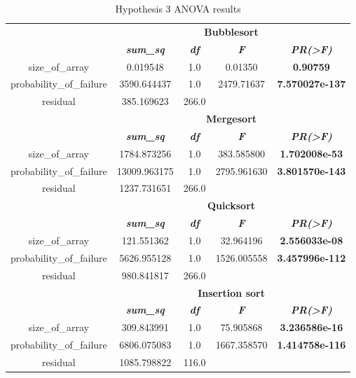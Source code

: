 \begin{table}[H]
    \caption{Hypothesis 3 ANOVA results}
    \begin{center}
    \begin{tabular}{|c|c|c|c|c|}
    \hline
    \multirow{2}{*}{\hfill}&\multicolumn{4}{|c|}{\textbf{Bubblesort}} \\
    \cline{2-5}
    &\textbf{\textit{sum\_sq}} & \textbf{\textit{df}} & \textbf{\textit{F}} & \textbf{\textit{PR(>F)}} \\
    \hline
    size\_of\_array & 0.019548 & 1.0 & 0.01350 & \textbf{0.90759} \\
    \hline
    probability\_of\_failure & 3590.644437 & 1.0 & 2479.71637 & \textbf{7.570027e-137} \\
    \hline
    residual & 385.169623 & 266.0 & &  \\
    \hline
    \multirow{2}{*}{\hfill}&\multicolumn{4}{|c|}{\textbf{Mergesort}} \\
    \cline{2-5}
    &\textbf{\textit{sum\_sq}} & \textbf{\textit{df}} & \textbf{\textit{F}} & \textbf{\textit{PR(>F)}} \\
    \hline
    size\_of\_array & 1784.873256 & 1.0 & 383.585800 & \textbf{1.702008e-53} \\
    \hline
    probability\_of\_failure & 13009.963175 & 1.0 & 2795.961630 & \textbf{3.801570e-143} \\
    \hline
    residual & 1237.731651 & 266.0 & &  \\
    \hline
    \multirow{2}{*}{\hfill}&\multicolumn{4}{|c|}{\textbf{Quicksort}} \\
    \cline{2-5}
    &\textbf{\textit{sum\_sq}} & \textbf{\textit{df}} & \textbf{\textit{F}} & \textbf{\textit{PR(>F)}} \\
    \hline
    size\_of\_array & 121.551362 & 1.0 & 32.964196 & \textbf{2.556033e-08} \\
    \hline
    probability\_of\_failure & 5626.955128 & 1.0 & 1526.005558 & \textbf{3.457996e-112} \\
    \hline
    residual & 980.841817 & 266.0 & &  \\
    \hline
    \multirow{2}{*}{\hfill}&\multicolumn{4}{|c|}{\textbf{Insertion sort}} \\
    \cline{2-5}
    &\textbf{\textit{sum\_sq}} & \textbf{\textit{df}} & \textbf{\textit{F}} & \textbf{\textit{PR(>F)}} \\
    \hline
    size\_of\_array & 309.843991 & 1.0 & 75.905868 & \textbf{3.236586e-16} \\
    \hline
    probability\_of\_failure & 6806.075083 & 1.0 & 1667.358570 & \textbf{1.414758e-116} \\
    \hline
    residual & 1085.798822 & 116.0 & & \\
    \hline
    \end{tabular}
    \label{tab-hypothesis3-testing}
    \end{center}
\end{table}

